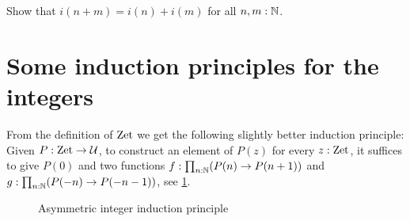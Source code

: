 \documentclass[a4,12pt]{amsart}
\begin{document}
\begin{xca}\label{xca:addition-on-Z-and-N}
Show that $i(n+m)=i(n)+i(m)$ for all $n,m:\mathbb{N}$.
\end{xca}


\section{Some induction principles for the integers}
\label{sec:integers-induction}

From the definition of $\mathrm{Zet}$ we get the following slightly better induction principle:
Given $P : \mathrm{Zet} \to \mathcal{U}$, to construct an element of $P(z)$ for every $z : \mathrm{Zet}$,
it suffices to give $P(0)$ and two functions
$f : \prod_{n:\mathbb{N}}(P(n) \to P(n+1))$ and
$g : \prod_{n:\mathbb{N}}(P(-n) \to P(-n-1))$,
see \cref{fig:integers-induction-asymmetric}.

\begin{figure}
  \centering
  \caption{Asymmetric integer induction principle}
  \label{fig:integers-induction-asymmetric}
\end{figure}
\end{document}
